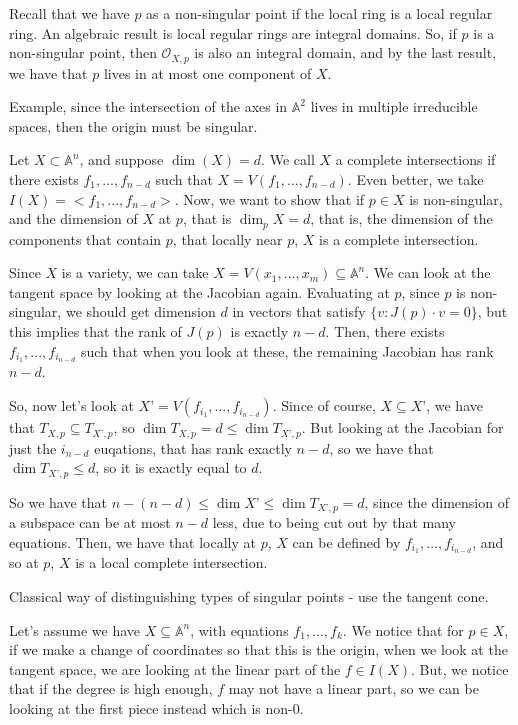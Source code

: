 \documentclass[10pt]{article}
\begin{document}
Recall that we have $p$ as a non-singular point if the local ring is a local regular ring. An algebraic result is local regular rings are integral domains. So, if $p$ is a non-singular point, then $\mathcal{O}_{X,p}$ is also an integral domain, and by the last result, we have that $p$ lives in at most one component of $X$.

Example, since the intersection of the axes in $\mathbb{A}^2$ lives in multiple irreducible spaces, then the origin must be singular. 

Let $X \subset \mathbb{A}^n$, and suppose $\dim(X) = d$. We call $X$ a complete intersections if there exists $f_1,...,f_{n-d}$ such that $X = V(f_1,...,f_{n-d})$. Even better, we take $I(X) = < f_1,...,f_{n-d} >$. Now, we want to show that if $p \in X$ is non-singular, and the dimension of $X$ at $p$, that is $\dim_p X = d$, that is, the dimension of the components that contain $p$, that locally near $p$, $X$ is a complete intersection.

Since $X$ is a variety, we can take $X = V(x_1,...,x_m) \subseteq \mathbb{A}^n$. We can look at the tangent space by looking at the Jacobian again. Evaluating at $p$, since $p$ is non-singular, we should get dimension $d$ in vectors that satisfy $\{ v : J(p) \cdot v = 0 \}$, but this implies that the rank of $J(p)$ is exactly $n-d$. Then, there exists $f_{i_1},...,f_{i_{n-d}}$ such that when you look at these, the remaining Jacobian has rank $n-d$.

So, now let’s look at $X’ = V(f_{i_1},...,f_{i_{n-d}})$. Since of course, $X \subseteq X’$, we have that $T_{X,p} \subseteq T_{X’,p}$, so $\dim T_{X,p} = d \leq \dim T_{X’,p}$. But looking at the Jacobian for just the $i_{n-d}$ euqations, that has rank exactly $n-d$, so we have that $\dim T_{X’,p} \leq d$, so it is exactly equal to $d$.

So we have that $ n - (n-d) \leq \dim X’ \leq \dim T_{X’,p}  = d$, since the dimension of a subspace can be at most $n-d$ less, due to being cut out by that many equations. Then, we have that locally at $p$, $X$ can be defined by $f_{i_1},...,f_{i_{n-d}}$, and so at $p$, $X$ is a local complete intersection.

Classical way of distinguishing types of singular points - use the tangent cone.

Let’s assume we have $X \subseteq \mathbb{A}^n$, with equations $f_1,...,f_k$. We notice that for $p \in X$, if we make a change of coordinates so that this is the origin, when we look at the tangent space, we are looking at the linear part of the $f \in I(X)$. But, we notice that if the degree is high enough, $f$ may not have a linear part, so we can be looking at the first piece instead which is non-0.
\end{document}
